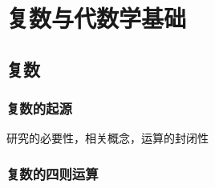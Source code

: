 \chapter{复数与代数学基础}

\section{复数}
\subsection{复数的起源}
研究的必要性，相关概念，运算的封闭性
\clearpage
\subsection{复数的四则运算}
\clearpage
